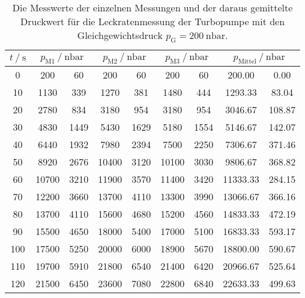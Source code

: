   \begin{table}[h]
    \centering
    \caption{Die Messwerte der einzelnen Messungen und der daraus gemittelte Druckwert für die Leckratenmessung der Turbopumpe mit den Gleichgewichtsdruck
              $p_\text{G} = \SI{200}{\nano\bar}$.}
    \label{tab:turbo_leck_2}
    \begin{tabular}{S[table-format=3.0] S @{${}\pm{}$} S S @{${}\pm{}$} S S @{${}\pm{}$} S S[table-format=5.2] @{${}\pm{}$} S[table-format=4.2]}
    \toprule
    {$t \mathbin{/} \si{\second} $} &  &  &  &  \\
       &   200 &   60 &   200 &   60 &   200 &   60 &   200.00 &   0.00 \\
    10  &  1130 &  339 &  1270 &  381 &  1480 &  444 &  1293.33 &  83.04 \\
    20  &  2780 &  834 &  3180 &  954 &  3180 &  954 &  3046.67 & 108.87 \\
    30  &  4830 & 1449 &  5430 & 1629 &  5180 & 1554 &  5146.67 & 142.07 \\
    40  &  6440 & 1932 &  7980 & 2394 &  7500 & 2250 &  7306.67 & 371.46 \\
    50  &  8920 & 2676 & 10400 & 3120 & 10100 & 3030 &  9806.67 & 368.82 \\
    60  & 10700 & 3210 & 11900 & 3570 & 11400 & 3420 & 11333.33 & 284.15 \\
    70  & 12200 & 3660 & 13700 & 4110 & 13300 & 3990 & 13066.67 & 366.16 \\
    80  & 13700 & 4110 & 15600 & 4680 & 15200 & 4560 & 14833.33 & 472.19 \\
    90  & 15500 & 4650 & 18000 & 5400 & 17000 & 5100 & 16833.33 & 593.17 \\
    100 & 17500 & 5250 & 20000 & 6000 & 18900 & 5670 & 18800.00 & 590.67 \\
    110 & 19700 & 5910 & 21800 & 6540 & 21400 & 6420 & 20966.67 & 525.64 \\
    120 & 21500 & 6450 & 23600 & 7080 & 22800 & 6840 & 22633.33 & 499.63 \\
    \bottomrule
    \end{tabular}
  \end{table}

